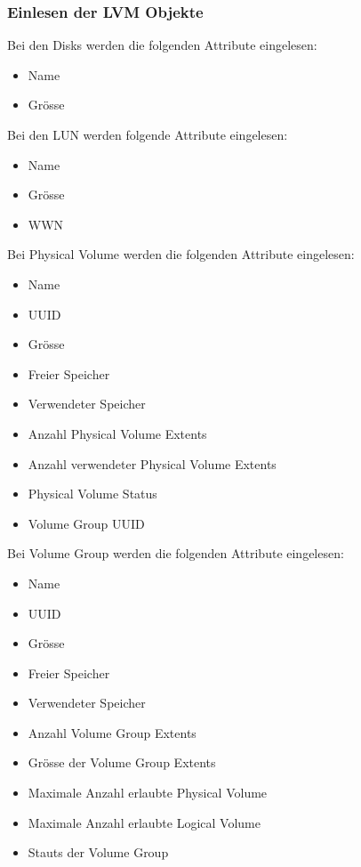 \subsubsection{Einlesen der LVM Objekte}
 
Bei den Disks werden die folgenden Attribute eingelesen:
\begin{itemize}
\item Name
\item Grösse\newline
\end{itemize}

Bei den LUN werden folgende Attribute eingelesen:
\begin{itemize}
\item Name
\item Grösse
\item WWN\newline
\end{itemize}

Bei Physical Volume werden die folgenden Attribute eingelesen:
\begin{itemize}
\item Name
\item UUID
\item Grösse
\item Freier Speicher
\item Verwendeter Speicher
\item Anzahl Physical Volume Extents
\item Anzahl verwendeter Physical Volume Extents
\item Physical Volume Status
\item Volume Group UUID\newline
\end{itemize}

Bei Volume Group werden die folgenden Attribute eingelesen:
\begin{itemize}
\item Name
\item UUID
\item Grösse
\item Freier Speicher
\item Verwendeter Speicher 
\item Anzahl Volume Group Extents
\item Grösse der Volume Group Extents
\item Maximale Anzahl erlaubte Physical Volume
\item Maximale Anzahl erlaubte Logical Volume
\item Stauts der Volume Group\newline
\end{itemize}


